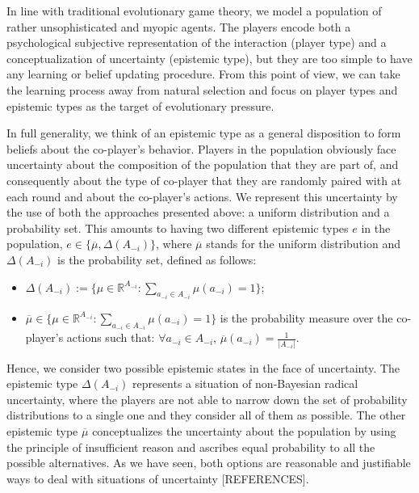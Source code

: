 \documentclass[fleqn,reqno,11pt]{article}
\begin{document}
In line with traditional evolutionary game theory, we model a population of rather unsophisticated and myopic agents. %
The players encode both a psychological subjective representation of the interaction (player type) and a conceptualization of uncertainty (epistemic type), but they are too simple to have any learning or belief updating procedure. From this point of view, we can take the learning process away from natural selection and focus on player types and epistemic types as the target of evolutionary pressure.

In full generality, we think of an epistemic type as a general disposition to form beliefs about the co-player’s behavior.    Players in the population obviously face uncertainty about the composition of the population that they are part of, and consequently about the type of co-player that they are randomly paired with at each round and about the co-player's actions. We represent this uncertainty by the use of both the approaches presented above: a uniform distribution and a probability set. This amounts to having two different epistemic types $e$ in the population, $e \in \lbrace \overline{\mu}, \Delta(A_{-i}) \rbrace $, where $\overline{\mu}$ stands for the uniform distribution and $\Delta(A_{-i})$ is the probability set, defined as follows:

\begin{itemize}

\item $ \Delta(A_{-i}):=\lbrace \mu \in \mathbb{R}^{A_{-i}}: \sum_{a_{-i} \in A_{-i}} \mu(a_{-i}) = 1 \rbrace$;

\item $\overline{\mu} \in \lbrace \mu \in \mathbb{R}^{A_{-i}}: \sum_{a_{-i} \in A_{-i}} \mu(a_{-i}) = 1 \rbrace$ is the probability measure over the co-player's actions such that: $\forall a_{-i} \in A_{-i}$, $\overline{\mu}(a_{-i})= \frac{1}{|A_{-i}|}$.

\end{itemize} 

Hence, we consider two possible epistemic states in the face of uncertainty. The epistemic type $\Delta(A_{-i})$ represents a situation of non-Bayesian radical uncertainty, where the players are not able to narrow down the set of probability distributions to a single one and they consider all of them as possible. The other epistemic type $\overline{\mu}$ conceptualizes the uncertainty about the population by using the principle of insufficient reason and ascribes equal probability to all the possible alternatives. As we have seen, both options are reasonable and justifiable ways to deal with situations of uncertainty [REFERENCES]. \\
\end{document}
